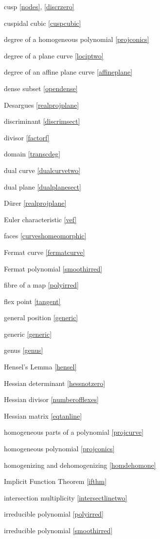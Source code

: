 \documentclass[leqno]{book}
\theoremstyle{definition}%
\numberwithin{equation}{section}
\theoremstyle{theorem} %
\begin{document}
\no
cusp \ref{nodes}, \ref{discrzero}


\no
cuspidal cubic \ref{cuspcubic}

\no
degree of a homogeneous polynomial  \ref{projconics}

\no
degree of a plane curve \ref{lociptwo}

\no
degree of an affine plane curve \ref{affineplane}

\no
dense subset  \ref{opendense}

\no
Desargues  \ref{realprojplane}

\no
discriminant \ref{discrimsect}

\no
divisor \ref{factorf}

\no
domain \ref{transcdeg}

\no
dual curve \ref{dualcurvetwo}

\no
dual plane \ref{dualplanesect}

\no
D\"urer  \ref{realprojplane}

\no
Euler characteristic \ref{vef}

\no
faces \ref{curveshomeomorphic}

\no
Fermat curve \ref{fermatcurve}

\no
Fermat polynomial \ref{smoothirred}

\no
fibre of a map \ref{polyirred}

\no
flex point \ref{tangent}

\no
general position \ref{generic}

\no
generic \ref{generic}

\no
genus \ref{genus}

\no
Hensel's Lemma \ref{hensel}

\no
Hessian determinant \ref{hessnotzero}

\no
Hessian divisor  \ref{numberofflexes}

\no
Hessian matrix \ref{eqtanline}

\no
homogeneous parts of a polynomial \ref{projcurve}

\no
homogeneous polynomial \ref{projconics}

\no
homogenizing and dehomogenizing \ref{homdehomone}

\no
Implicit Function Theorem \ref{ifthm}

\no
intersection multiplicity \ref{intersectlinetwo}

\no
irreducible polynomial \ref{polyirred}

\no
irreducible polynomial \ref{smoothirred}
\end{document}
